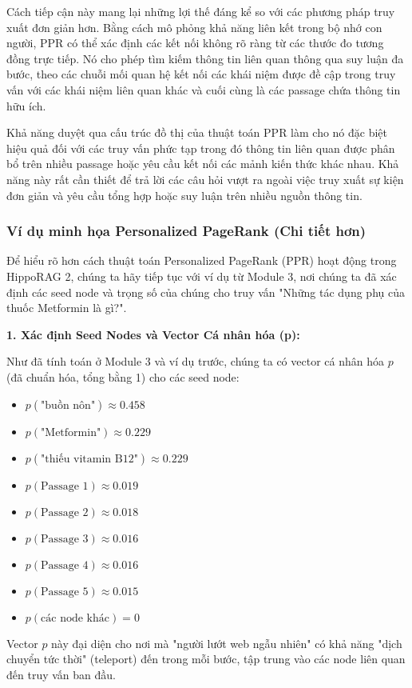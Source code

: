 \documentclass[../main.tex]{subfiles}
\begin{document}
Cách tiếp cận này mang lại những lợi thế đáng kể so với các phương pháp truy xuất đơn giản hơn. Bằng cách mô phỏng khả năng liên kết trong bộ nhớ con người, PPR có thể xác định các kết nối không rõ ràng từ các thước đo tương đồng trực tiếp. Nó cho phép tìm kiếm thông tin liên quan thông qua suy luận đa bước, theo các chuỗi mối quan hệ kết nối các khái niệm được đề cập trong truy vấn với các khái niệm liên quan khác và cuối cùng là các passage chứa thông tin hữu ích. 

Khả năng duyệt qua cấu trúc đồ thị của thuật toán PPR làm cho nó đặc biệt hiệu quả đối với các truy vấn phức tạp trong đó thông tin liên quan được phân bổ trên nhiều passage hoặc yêu cầu kết nối các mảnh kiến thức khác nhau. Khả năng này rất cần thiết để trả lời các câu hỏi vượt ra ngoài việc truy xuất sự kiện đơn giản và yêu cầu tổng hợp hoặc suy luận trên nhiều nguồn thông tin.

\subsubsection{Ví dụ minh họa Personalized PageRank (Chi tiết hơn)}

Để hiểu rõ hơn cách thuật toán Personalized PageRank (PPR) hoạt động trong HippoRAG 2, chúng ta hãy tiếp tục với ví dụ từ Module 3, nơi chúng ta đã xác định các seed node và trọng số của chúng cho truy vấn "Những tác dụng phụ của thuốc Metformin là gì?".

\textbf{1. Xác định Seed Nodes và Vector Cá nhân hóa (p):}

Như đã tính toán ở Module 3 và ví dụ trước, chúng ta có vector cá nhân hóa \(p\) (đã chuẩn hóa, tổng bằng 1) cho các seed node:
\begin{itemize}
    \item \(p(\text{"buồn nôn"}) \approx 0.458\)
    \item \(p(\text{"Metformin"}) \approx 0.229\)
    \item \(p(\text{"thiếu vitamin B12"}) \approx 0.229\)
    \item \(p(\text{Passage 1}) \approx 0.019\)
    \item \(p(\text{Passage 2}) \approx 0.018\)
    \item \(p(\text{Passage 3}) \approx 0.016\)
    \item \(p(\text{Passage 4}) \approx 0.016\)
    \item \(p(\text{Passage 5}) \approx 0.015\)
    \item \(p(\text{các node khác}) = 0\)
\end{itemize}
Vector \(p\) này đại diện cho nơi mà "người lướt web ngẫu nhiên" có khả năng "dịch chuyển tức thời" (teleport) đến trong mỗi bước, tập trung vào các node liên quan đến truy vấn ban đầu.
\end{document}

